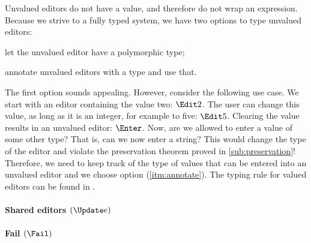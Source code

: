 Unvalued editors do not have a value,
and therefore do not wrap an expression.
Because we strive to a fully typed system,
we have two options to type unvalued editors:
\begin{enumerate*}
  \item let the unvalued editor have a polymorphic type;
  \item annotate unvalued editors with a type and use that. \label{itm:annotate}
\end{enumerate*}

The first option sounds appealing.
However, consider the following use case.
We start with an editor containing the value two: $\Edit 2$.
The user can change this value, as long as it is an integer,
for example to five: $\Edit 5$.
Clearing the value results in an unvalued editor: $\Enter$.
Now, are we allowed to enter a value of some other type?
That is, can we now enter a string?
This would change the type of the editor
and violate the preservation theorem proved in \autoref{sub:preservation}!
Therefore,
we need to keep track of the type of values that can be entered into an unvalued editor
and we choose option (\ref{itm:annotate}).
The typing rule for valued editors can be found in .



\paragraph{Shared editors $(\Update e)$}



\paragraph{Fail $(\Fail)$}



